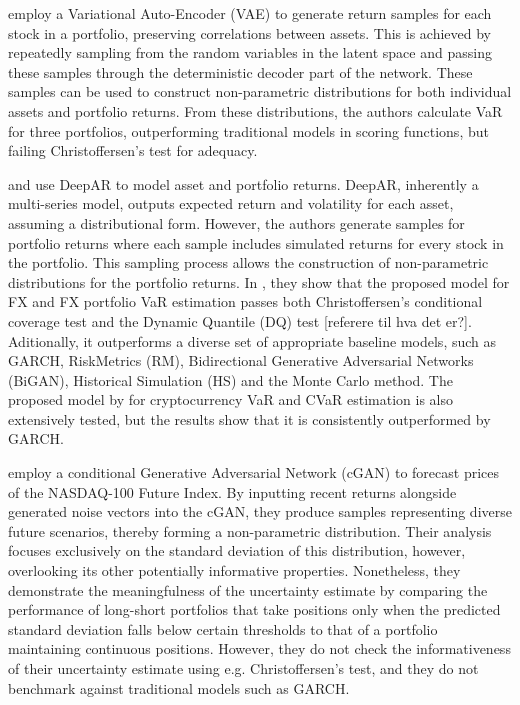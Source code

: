 \textcite{arian2022encoded} employ a Variational Auto-Encoder (VAE) to generate return samples for each stock in a portfolio, preserving correlations between assets. This is achieved by repeatedly sampling from the random variables in the latent space and passing these samples through the deterministic decoder part of the network. These samples can be used to construct non-parametric distributions for both individual assets and portfolio returns. From these distributions, the authors calculate VaR for three portfolios, outperforming traditional models in scoring functions, but failing Christoffersen's test for adequacy.

\textcite{Fatouros2023DeepVaR} and \textcite{Almeida2024RiskForecasting} use DeepAR to model asset and portfolio returns. DeepAR, inherently a multi-series model, outputs expected return and volatility for each asset, assuming a distributional form. However, the authors generate samples for portfolio returns where each sample includes simulated returns for every stock in the portfolio. This sampling process allows the construction of non-parametric distributions for the portfolio returns. In \textcite{Fatouros2023DeepVaR}, they show that the proposed model for FX and FX portfolio VaR estimation passes both Christoffersen's conditional coverage test and the Dynamic Quantile (DQ) test [referere til hva det er?]. Aditionally, it outperforms a diverse set of appropriate baseline models, such as GARCH, RiskMetrics (RM), Bidirectional Generative
Adversarial Networks (BiGAN), Historical Simulation (HS) and the Monte Carlo method. The proposed model by \textcite{Almeida2024RiskForecasting} for cryptocurrency VaR and CVaR estimation is also extensively tested, but the results show that it is consistently outperformed by GARCH.

\textcite{lee2021estimation} employ a conditional Generative Adversarial Network (cGAN) to forecast prices of the NASDAQ-100 Future Index. By inputting recent returns alongside generated noise vectors into the cGAN, they produce samples representing diverse future scenarios, thereby forming a non-parametric distribution. Their analysis focuses exclusively on the standard deviation of this distribution, however, overlooking its other potentially informative properties. Nonetheless, they demonstrate the meaningfulness of the uncertainty estimate by comparing the performance of long-short portfolios that take positions only when the predicted standard deviation falls below certain thresholds to that of a portfolio maintaining continuous positions. However, they do not check the informativeness of their uncertainty estimate using e.g. Christoffersen's test, and they do not benchmark against traditional models such as GARCH.

